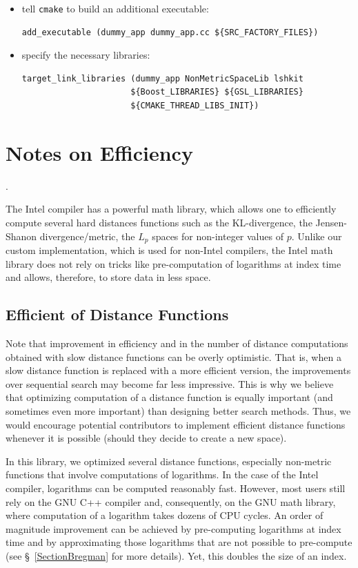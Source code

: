 \documentclass[runningheads,a4paper]{llncs}
\newcommand{\todonoteinline}[1]{\todo[color=red!40,inline,caption={TODO}]{#1}}
\newcommand{\ttt}[1]{\texttt{#1}}
\begin{document}
{\begin{itemize}
\item tell \ttt{cmake} to build an additional executable:
\begin{verbatim}
add_executable (dummy_app dummy_app.cc ${SRC_FACTORY_FILES})
\end{verbatim}

\item specify the necessary libraries:
\begin{verbatim}
target_link_libraries (dummy_app NonMetricSpaceLib lshkit 
                      ${Boost_LIBRARIES} ${GSL_LIBRARIES} 
                      ${CMAKE_THREAD_LIBS_INIT})
\end{verbatim}
\end{itemize}

\section{Notes on Efficiency}\label{SectionEfficiency}
\todonoteinline{Integrate this part}.

The Intel compiler has a powerful math library, 
which allows one to efficiently compute several hard distances functions
such as the KL-divergence, the Jensen-Shanon divergence/metric, 
the $L_p$ spaces for non-integer values of $p$.
Unlike our custom implementation, which is used for non-Intel compilers,
the Intel math library does not rely on tricks like pre-computation of logarithms at index time and
allows, therefore, to store data in less space. 

\subsection{Efficient of Distance Functions}
Note that improvement in efficiency and in the number of distance computations
obtained with slow distance functions can be overly optimistic.
That is, when a slow distance function is replaced with a more efficient version,
the improvements over sequential search may become far less impressive.
This is why we believe that optimizing  computation of a distance function 
is equally important (and sometimes even more important) 
than designing better search methods.
Thus, we would encourage potential contributors to 
implement efficient distance functions whenever it is possible 
(should they decide to create a new space).

In this library, we optimized several distance functions, 
especially non-metric functions that involve computations of logarithms.
In the case of the Intel compiler, logarithms can be computed reasonably fast.
However, most users still rely on the GNU C++ compiler and, consequently, on the GNU math library, 
where computation of a logarithm takes dozens of CPU cycles.
An order of magnitude improvement can be achieved by pre-computing 
logarithms at index time and by approximating those logarithms that are not possible
to pre-compute (see \S~\ref{SectionBregman} for more details).
Yet, this doubles the size of an index.

}
\end{document}
